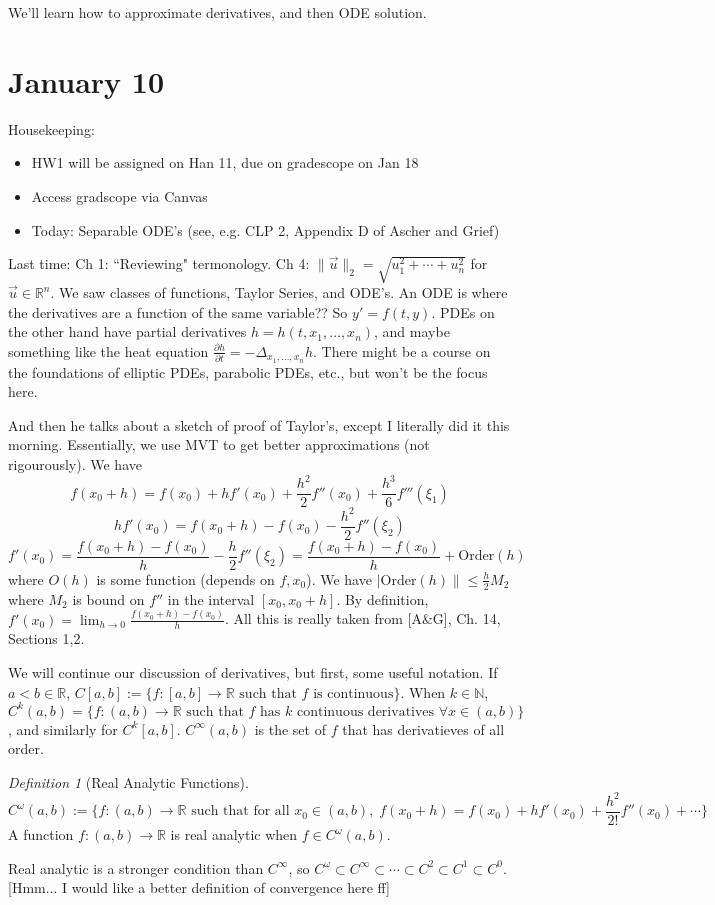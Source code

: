 \documentclass{article}
\theoremstyle{plain}
\theoremstyle{remark}
\newtheorem{definition}{Definition}
\newcommand{\N}{{\mathbb N}}
\newcommand{\R}{{\mathbb R}}
\begin{document}
We'll learn how to approximate derivatives, and then ODE solution.

\section{January 10}
Housekeeping:
\begin{itemize}
	\item HW1 will be assigned on Han 11, due on gradescope on Jan 18
	\item Access gradscope via Canvas
	\item Today: Separable ODE's (see, e.g. CLP 2, Appendix D of Ascher and Grief)
\end{itemize}
Last time:
Ch 1: ``Reviewing" termonology.
Ch 4: $\lVert \vec{u} \rVert_2 = \sqrt{u_1^2 + \cdots + u_n^2}$ for $\vec{u} \in \R^n$.
We saw classes of functions, Taylor Series, and ODE's.
An ODE is where the derivatives are a function of the same variable??
So $y' = f(t,y)$.
PDEs on the other hand have partial derivatives $h = h(t,x_1,\dots,x_n)$,
and maybe something like the heat equation
$\frac{\partial h}{\partial t} = - \Delta_{x_1,\dots,x_n}h$.
There might be a course on the foundations of elliptic PDEs, parabolic PDEs, etc.,
but won't be the focus here.

And then he talks about a sketch of proof of Taylor's,
except I literally did it this morning.
Essentially, we use MVT to get better approximations (not rigourously).
We have
\[
	f(x_0 + h) = f(x_0) + hf'(x_0) + \frac{h^2}{2}f''(x_0) + \frac{h^3}{6}f'''(\xi_1)
\]
\[
	hf'(x_0) = f(x_0 + h) - f(x_0) - \frac{h^2}{2}f''(\xi_2)
\]
\[
	f'(x_0) = \frac{f(x_0 + h) - f(x_0)}{h} - \frac{h}{2}f''(\xi_2)
	= \frac{f(x_0 + h) - f(x_0)}{h} + \mathrm{Order}(h)
\]
where $O(h)$ is some function (depends on $f,x_0$).
We have $\lvert \mathrm{Order}(h) \rVert \leq \frac{h}{2} M_2$
where $M_2$ is bound on $f''$ in the interval $[x_0,x_0+h]$.
By definition, $f'(x_0) = \lim_{h\to0} \frac{f(x_0+h)-f(x_0)}{h}$.
All this is really taken from [A\&G], Ch. 14, Sections 1,2.

We will continue our discussion of derivatives, but first, some useful notation.
If $a < b \in \R$,
$C[a,b] := \{ f\colon [a,b] \to \R \text{ such that }f \text{ is continuous}\}$.
When $k \in \N$,
\[
	C^k(a,b) = \{ f\colon (a,b) \to \R
		\text{ such that }f \text{ has } k \text{ continuous derivatives }
	\forall x \in (a,b)\}
\]
,
and similarly for $C^k[a,b]$.
$C^\infty(a,b)$ is the set of $f$ that has derivatieves of all order.
\begin{definition}[Real Analytic Functions]
\[
	C^\omega(a,b) :=
	\{f \colon (a,b) \to \R \text{ such that for all }
	x_0 \in (a,b), \; f(x_0+h) = f(x_0) + hf'(x_0) + \frac{h^2}{2!}f''(x_0) + \cdots\}
\]
A function $f \colon (a,b) \to \R$ is real analytic when $f \in C^\omega(a,b)$.
\end{definition}
Real analytic is a stronger condition than $C^\infty$,
so $C^\omega \subset C^\infty \subset \cdots \subset C^2 \subset C^1 \subset C^0$.
[Hmm... I would like a better definition of convergence here ff]
\end{document}
